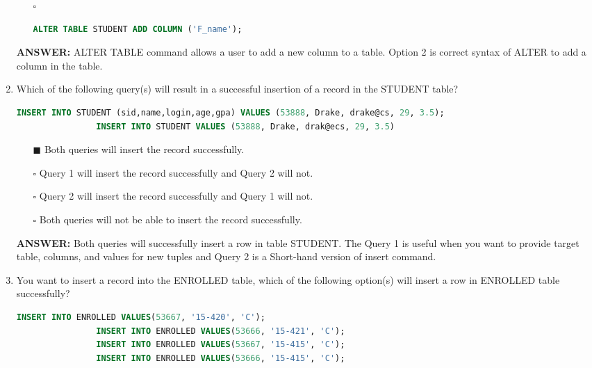 \documentclass[10pt]{article}
\begin{document}
\begin{enumerate}
\begin{enumerate}
				\item[$\square$] 
					\begin{lstlisting}[language=SQL,firstline=1, lastline=1, numbers = right] 
						ALTER TABLE STUDENT ADD COLUMN ('F_name');
					\end{lstlisting}
			\end{enumerate}
			\color{red} \textbf{ANSWER:} \color{black} ALTER TABLE command allows a user to add a new column to a table. Option 2 is correct syntax of ALTER to add a column in the table.
		
		\item Which of the following query(s) will result in a successful insertion of a record in the STUDENT table?
			\begin{lstlisting}[language=SQL,firstline=1, lastline=2] 
				INSERT INTO STUDENT (sid,name,login,age,gpa) VALUES (53888, Drake, drake@cs, 29, 3.5);
				INSERT INTO STUDENT VALUES (53888, Drake, drak@ecs, 29, 3.5)
			\end{lstlisting} 

			\begin{enumerate}
				\item[$\blacksquare$] Both queries will insert the record successfully.
				\item[$\square$] Query 1 will insert the record successfully and Query 2 will not.
				\item[$\square$] Query 2 will insert the record successfully and Query 1 will not.
				\item[$\square$] Both queries will not be able to insert the record successfully.
			\end{enumerate}
			\color{red} \textbf{ANSWER:} \color{black} Both queries will successfully insert a row in table STUDENT. The Query 1 is useful when you want to provide target table, columns, and values for new tuples and Query 2 is a Short-hand version of insert command.

		\item You want to insert a record into the ENROLLED table, which of the following option(s) will insert a row in ENROLLED table successfully?
			\begin{lstlisting}[language=SQL,firstline=1, lastline=4] 
				INSERT INTO ENROLLED VALUES(53667, '15-420', 'C');
				INSERT INTO ENROLLED VALUES(53666, '15-421', 'C');
				INSERT INTO ENROLLED VALUES(53667, '15-415', 'C');
				INSERT INTO ENROLLED VALUES(53666, '15-415', 'C');
			\end{lstlisting}


\end{enumerate}
\end{document}
